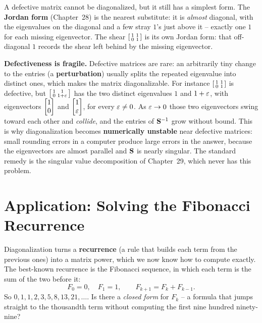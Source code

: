 \begin{remark}
\label{ch24:jordan-preview}
A defective matrix cannot be diagonalized, but it still has a simplest form. The
\textbf{Jordan form} (Chapter~28) is the nearest substitute: it is
\emph{almost} diagonal, with the eigenvalues on the diagonal and a few stray
$1$'s just above it -- exactly one $1$ for each missing eigenvector. The shear
$\begin{bsmallmatrix}1&1\\0&1\end{bsmallmatrix}$ is its own Jordan form: that
off-diagonal $1$ records the shear left behind by the missing eigenvector.
\end{remark}

\begin{connectionbox}
\textbf{Defectiveness is fragile.} Defective
matrices are rare: an arbitrarily tiny change to the entries (a
\textbf{perturbation}) usually splits the repeated eigenvalue into distinct ones,
which makes the matrix diagonalizable. For instance $\begin{bsmallmatrix}1&1\\0&1\end{bsmallmatrix}$ is
defective, but $\begin{bsmallmatrix}1&1\\0&1+\varepsilon\end{bsmallmatrix}$ has the two
distinct eigenvalues $1$ and $1+\varepsilon$, with eigenvectors $\begin{bmatrix}1\\0\end{bmatrix}$ and
$\begin{bmatrix}1\\\varepsilon\end{bmatrix}$, for every $\varepsilon\neq0$. As $\varepsilon\to0$ those two
eigenvectors swing toward each other and \emph{collide}, and the entries of
$\mathbf{S}^{-1}$ grow without bound. This is why diagonalization becomes
\textbf{numerically unstable} near defective matrices: small rounding errors in
a computer produce large errors in the answer, because the eigenvectors are
almost parallel and $\mathbf{S}$ is nearly singular. The standard remedy is the
singular value decomposition of Chapter~29, which never has this problem.
\end{connectionbox}

\section{Application: Solving the Fibonacci Recurrence}
\label{ch24:fibonacci}

Diagonalization turns a \textbf{recurrence} (a rule that builds each term from
the previous ones) into a matrix power, which we now know how to compute
exactly. The best-known recurrence is the Fibonacci sequence, in which each term
is the sum of the two before it:
\[
  F_0 = 0,\quad F_1 = 1,\qquad F_{k+1} = F_k + F_{k-1}.
\]
So $0,1,1,2,3,5,8,13,21,\dots$. Is there a \emph{closed form} for $F_k$ -- a
formula that jumps straight to the thousandth term without computing the first
nine hundred ninety-nine?

